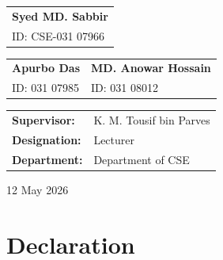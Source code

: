 \documentclass[12pt,a4paper,oneside]{report}
\begin{document}
\begin{titlepage}
\begin{center}
\begin{center}
\vspace{1cm}

\begin{tabular}{p{6cm}}

\centering
\textbf{Syed MD. Sabbir} \\

\centering
ID: CSE-031 07966\\

\end{tabular}

\vspace{1cm}

\begin{tabular}{p{6cm} p{6cm}}

\centering
\textbf{Apurbo Das} &
\centering
\textbf{MD. Anowar Hossain} \\

\centering
ID: 031 07985 &
\centering
ID: 031 08012 \\

\end{tabular}

\end{center}

\vspace{1.5cm}

\begin{table}[H]
\centering
\begin{tabular}{ll}
\textbf{Supervisor:} & K. M. Tousif bin Parves \\
\textbf{Designation:} & Lecturer \\
\textbf{Department:} & Department of CSE \\
\end{tabular}
\end{table}

\vfill

{\Large 12 May 2026}

\end{center}

\end{titlepage}


\chapter*{Declaration}
\end{document}
